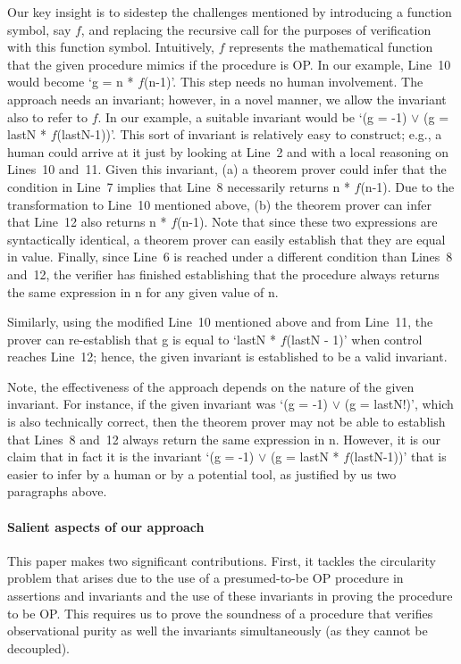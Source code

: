 Our key insight is to sidestep the challenges mentioned by introducing a
function symbol, say $f$, and replacing the recursive call for the purposes
of verification with this function symbol. Intuitively, $f$ represents the
mathematical function that the given procedure mimics if the procedure is
OP.  In our example, Line~10 would become `g = n * $f$(n-1)'. This step
needs no human involvement. The approach needs an invariant; however, in a
novel manner, we allow the invariant also to refer to $f$. In our example,
a suitable invariant would be `(g = -1) $\vee$ (g = lastN *
$f$(lastN-1))'. This sort of invariant is relatively easy to construct;
e.g., a human could arrive at it just by looking at Line~2 and with a local
reasoning on Lines~10 and~11. Given this invariant, (a) a theorem prover
could infer that the condition in Line~7 implies that Line~8 necessarily
returns n * $f$(n-1). Due to the transformation to Line~10 mentioned above,
(b) the theorem prover can infer that Line~12 also returns n *
$f$(n-1). Note that since these two expressions are syntactically
identical, a theorem prover can easily establish that they are equal in
value.  Finally, since Line~6 is reached under a different condition than
Lines~8 and~12, the verifier has finished establishing that the procedure
always returns the same expression in n for any given value of n.

Similarly, using the modified Line~10 mentioned above and from Line~11, the
prover can re-establish that g is equal to `lastN * $f$(lastN - 1)' when
control reaches Line~12; hence, the given invariant is established to be a
valid invariant.

Note, the effectiveness of the approach depends on the nature of the given
invariant. For instance, if the given invariant was `(g = -1) $\vee$ (g =
lastN!)', which is also technically correct, then the theorem prover may
not be able to establish that Lines~8 and~12 always return the same
expression in n. However, it is our claim that in fact it is the invariant
`(g = -1) $\vee$ (g = lastN * $f$(lastN-1))' that is easier to infer by a
human or by a potential tool, as justified by us two paragraphs above.

\paragraph{Salient aspects of our approach}

This paper makes two significant contributions. First, it tackles the circularity
problem that arises due to the use of a presumed-to-be OP procedure
in assertions and invariants and the use of these invariants in proving the
procedure to be OP. This requires us to prove the soundness of a procedure
that verifies observational purity as well the invariants simultaneously (as they
cannot be decoupled).

